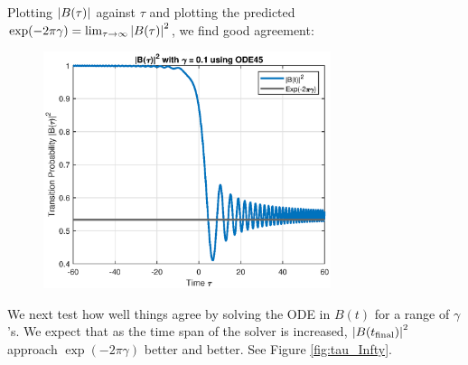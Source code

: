 \documentclass{book}
\theoremstyle{definition}
\begin{document}
Plotting $\abs{B(\tau)}$ against $\tau$ and plotting the predicted $\exp(-2\pi \gamma) = \lim_{\tau\to\infty}\abs{B(\tau)}^2$, we find good agreement:
\begin{figure}[!htb]
	\centering
	\includegraphics[width=0.75\textwidth]{images/LZ}
\end{figure}


We next test how well things agree by solving the ODE in $B(t)$ for a range of $\gamma$'s. We expect that as the time span of the solver is increased, $\abs{B(t_{\text{final}})}^2$ approach $\exp(-2\pi \gamma)$ better and better. See Figure \ref{fig:tau_Infty}.
\end{document}
